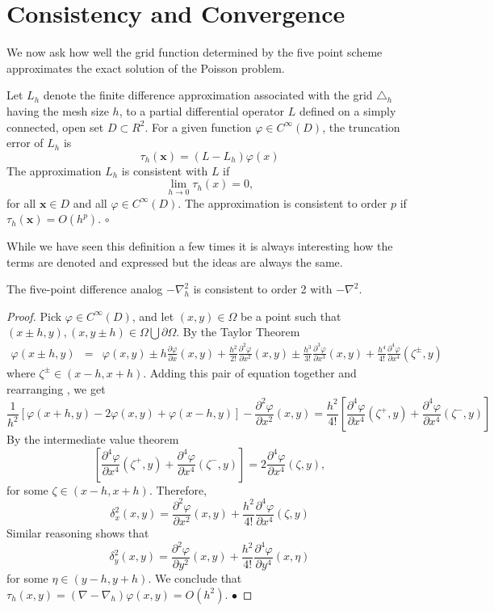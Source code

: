 \section{Consistency and Convergence}
We now ask how well the grid function determined by the five point scheme approximates
the exact solution of the Poisson problem.
\begin{definition}
Let $L_h$ denote the finite difference approximation associated with the grid $\triangle_h$ having the mesh size $h$, to a partial differential operator $L$ defined on
a simply connected, open set $D \subset R^2$. For a given function $\varphi\in C^{\infty}(D)$,
the truncation error of $L_h$ is
\[\tau_{h}(\mathbf{x})=(L-L_h)\varphi(x) \]
The approximation $L_h$ is consistent with $L$ if
\[ \lim_{h\rightarrow 0}\tau_h(x)=0,\]
for all $\mathbf{x} \in D$ and all $\varphi \in C^{\infty}(D)$. The approximation is consistent to order $p$ if $\tau_h(\mathbf{x})=O(h^p)$.
$\circ$
\end{definition}
While we have seen this definition a few times it is always interesting how the
terms are denoted and expressed but the ideas are always the same.
\begin{proposition}
The five-point difference analog $-\nabla^2_h$ is consistent to order 2 with $-\nabla^2$.
\end{proposition}
\begin{proof}
Pick $\varphi \in C^{\infty}(D)$, and let $(x,y) \in \Omega$ be a point such that $(x\pm h, y),(x,y \pm h) \in \Omega\bigcup \partial\Omega$.  By the Taylor Theorem
\begin{eqnarray*}
\varphi(x\pm h,y)&=&\varphi(x,y) \pm h \frac{\partial \varphi}{\partial x}(x,y)+\frac{h^2}{2!}\frac{\partial^2 \varphi}{\partial x^2}(x,y) \pm\frac{h^3}{3!}\frac{\partial^3 \varphi}{\partial x^3}(x,y)+\frac{h^4}{4!}\frac{\partial^4 \varphi}{\partial x^4}(\zeta^{\pm},y)
\end{eqnarray*}
where $\zeta^{\pm} \in (x-h,x+h)$. Adding this pair of equation together and rearranging , we get
\[\frac{1}{h^2}[\varphi(x+h,y)-2\varphi(x,y)+\varphi(x-h,y) ] -\frac{\partial^2 \varphi}{\partial x^2}(x,y)=\frac{h^2}{4!}\left[\frac{\partial^4 \varphi}{\partial x^4}(\zeta^{+},y)+
\frac{\partial^4 \varphi}{\partial x^4}(\zeta^{-},y)
 \right]
\]
By the intermediate value theorem
\[\left[\frac{\partial^4 \varphi}{\partial x^4}(\zeta^{+},y)+
\frac{\partial^4 \varphi}{\partial x^4}(\zeta^{-},y)
 \right]
=2\frac{\partial^4 \varphi}{\partial x^4}(\zeta,y),\]
for some $\zeta \in (x-h,x+h)$.  Therefore,
\[\delta_x^2(x,y)
=\frac{\partial^2 \varphi}{\partial x^2}(x,y)+\frac{h^2}{4!}\frac{\partial^4 \varphi}{\partial x^4}(\zeta,y)
\]
Similar reasoning shows that
\[\delta_y^2(x,y)
=\frac{\partial^2 \varphi}{\partial y^2}(x,y)+\frac{h^2}{4!}\frac{\partial^4 \varphi}{\partial y^4}(x,\eta)
\]
for some $\eta \in (y-h,y+h)$. We conclude that $\tau_h(x,y)=(\nabla-\nabla_h)\varphi(x,y)=O(h^2).$
$\bullet$\end{proof}
